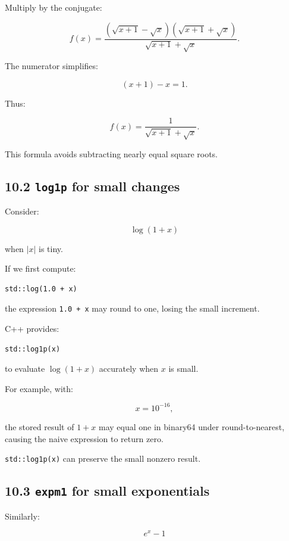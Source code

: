 Multiply by the conjugate:

\[ f(x)= \frac{ (\sqrt{x+1}-\sqrt x)(\sqrt{x+1}+\sqrt x) }{ \sqrt{x+1}+\sqrt x }. \]

The numerator simplifies:

\[ (x+1)-x=1. \]

Thus:

\[ \boxed{ f(x)= \frac1{\sqrt{x+1}+\sqrt x} }. \]

This formula avoids subtracting nearly equal square roots.

\subsection{\texorpdfstring{10.2 \texttt{log1p} for small changes}{10.2 log1p for small changes}}\label{02-foundations-ii-ch028-log1p-for-small-changes}

Consider:

\[ \log(1+x) \]

when \(|x|\) is tiny.

If we first compute:

\begin{verbatim}
std::log(1.0 + x)
\end{verbatim}

the expression \texttt{1.0\ +\ x} may round to one, losing the small increment.

C++ provides:

\begin{verbatim}
std::log1p(x)
\end{verbatim}

to evaluate \(\log(1+x)\) accurately when \(x\) is small.

For example, with:

\[ x=10^{-16}, \]

the stored result of \(1+x\) may equal one in binary64 under round-to-nearest, causing the naive expression to return zero.

\texttt{std::log1p(x)} can preserve the small nonzero result.

\subsection{\texorpdfstring{10.3 \texttt{expm1} for small exponentials}{10.3 expm1 for small exponentials}}\label{02-foundations-ii-ch028-expm1-for-small-exponentials}

Similarly:

\[ e^x-1 \]

